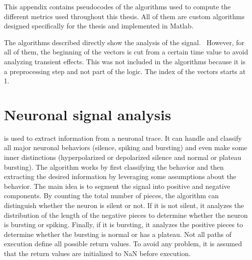 \label{apx:algos}

This appendix contains pseudocodes of the algorithms used to compute the different metrics used throughout this thesis. All of them are custom algorithms designed specifically for the thesis and implemented in Matlab.

The algorithms described directly show the analysis of the signal. 
However, for all of them, the beginning of the vectors is cut from a certain time value to avoid analyzing transient effects.
This was not included in the algorithms because it is a preprocessing step and not part of the logic.
The index of the vectors starts at 1.

\section{Neuronal signal analysis}

 is used to extract information from a neuronal trace. It can handle and classify all major neuronal behaviors (silence, spiking and bursting) and even make some inner distinctions (hyperpolarized or depolarized silence and normal or plateau bursting).
The algorithm works by first classifying the behavior and then extracting the desired information by leveraging some assumptions about the behavior.
The main idea is to segment the signal into positive and negative components.
By counting the total number of pieces, the algorithm can distinguish whether the neuron is silent or not.
If it is not silent, it analyzes the distribution of the length of the negative pieces to determine whether the neuron is bursting or spiking.
Finally, if it is bursting, it analyzes the positive pieces to determine whether the bursting is normal or has a plateau.
Not all paths of execution define all possible return values.
To avoid any problem, it is assumed that the return values are initialized to NaN before execution.

